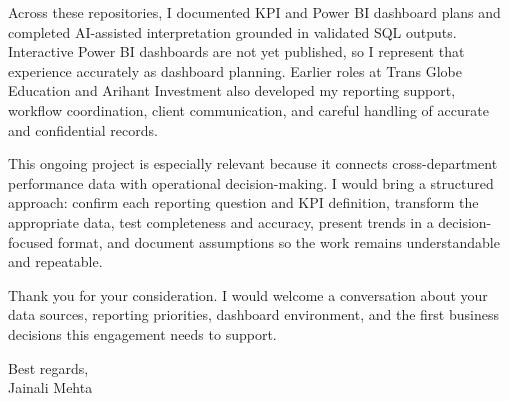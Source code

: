 \documentclass[letterpaper,11pt]{article}
\begin{document}
\bigbreak
Across these repositories, I documented KPI and Power BI dashboard plans and completed AI-assisted interpretation grounded in validated SQL outputs. Interactive Power BI dashboards are not yet published, so I represent that experience accurately as dashboard planning. Earlier roles at Trans Globe Education and Arihant Investment also developed my reporting support, workflow coordination, client communication, and careful handling of accurate and confidential records.

\bigbreak
This ongoing project is especially relevant because it connects cross-department performance data with operational decision-making. I would bring a structured approach: confirm each reporting question and KPI definition, transform the appropriate data, test completeness and accuracy, present trends in a decision-focused format, and document assumptions so the work remains understandable and repeatable.

\bigbreak
Thank you for your consideration. I would welcome a conversation about your data sources, reporting priorities, dashboard environment, and the first business decisions this engagement needs to support.

\bigbreak
Best regards,\\
Jainali Mehta
\end{document}
